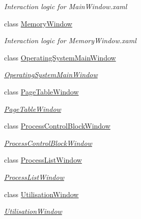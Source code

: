 \begin{DoxyCompactItemize}
\begin{DoxyCompactList}\small\item\em Interaction logic for Main\+Window.\+xaml \end{DoxyCompactList}\item 
class \hyperlink{class_c_p_u___o_s___simulator_1_1_memory_window}{Memory\+Window}
\begin{DoxyCompactList}\small\item\em Interaction logic for Memory\+Window.\+xaml \end{DoxyCompactList}\item 
class \hyperlink{class_c_p_u___o_s___simulator_1_1_operating_system_main_window}{Operating\+System\+Main\+Window}
\begin{DoxyCompactList}\small\item\em \hyperlink{class_c_p_u___o_s___simulator_1_1_operating_system_main_window}{Operating\+System\+Main\+Window} \end{DoxyCompactList}\item 
class \hyperlink{class_c_p_u___o_s___simulator_1_1_page_table_window}{Page\+Table\+Window}
\begin{DoxyCompactList}\small\item\em \hyperlink{class_c_p_u___o_s___simulator_1_1_page_table_window}{Page\+Table\+Window} \end{DoxyCompactList}\item 
class \hyperlink{class_c_p_u___o_s___simulator_1_1_process_control_block_window}{Process\+Control\+Block\+Window}
\begin{DoxyCompactList}\small\item\em \hyperlink{class_c_p_u___o_s___simulator_1_1_process_control_block_window}{Process\+Control\+Block\+Window} \end{DoxyCompactList}\item 
class \hyperlink{class_c_p_u___o_s___simulator_1_1_process_list_window}{Process\+List\+Window}
\begin{DoxyCompactList}\small\item\em \hyperlink{class_c_p_u___o_s___simulator_1_1_process_list_window}{Process\+List\+Window} \end{DoxyCompactList}\item 
class \hyperlink{class_c_p_u___o_s___simulator_1_1_utilisation_window}{Utilisation\+Window}
\begin{DoxyCompactList}\small\item\em \hyperlink{class_c_p_u___o_s___simulator_1_1_utilisation_window}{Utilisation\+Window} \end{DoxyCompactList}\end{DoxyCompactItemize}
